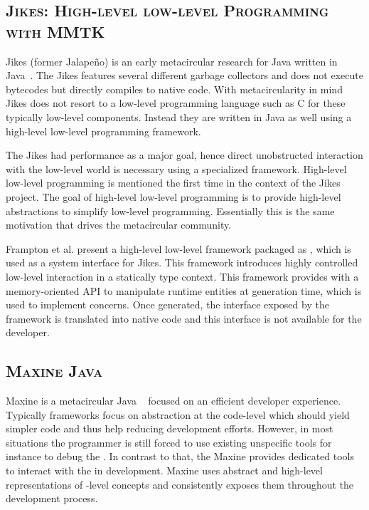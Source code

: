 \subsection*{\textsc{Jikes: High-level low-level Programming with MMTK}}
Jikes (former Jalapeño) is an early metacircular research \VM for Java written in Java~\cite{Alpe00a}.
The Jikes \VM features several different garbage collectors and does not execute bytecodes but directly compiles to native code.
With metacircularity in mind Jikes does not resort to a low-level programming language such as C for these typically low-level \VM components.
Instead they are written in Java as well using a high-level low-level programming framework.

The Jikes \VM had performance as a major goal, hence direct unobstructed interaction with the low-level world is necessary using a specialized framework.
High-level low-level programming \cite{Fram09a} is mentioned the first time in the context of the Jikes \VM project.
The goal of high-level low-level programming is to provide high-level abstractions to simplify low-level programming.
Essentially this is the same motivation that drives the metacircular \VM community.

Frampton et al. present a high-level low-level framework packaged as , which is used as a system interface for Jikes. This framework introduces highly controlled low-level interaction in a statically type context. This framework provides with a memory-oriented API to manipulate runtime entities at \VM generation time, which is used to implement \VM concerns. Once generated, the interface exposed by the  framework is translated into native code and this interface is not available for the developer.


\subsection*{\textsc{Maxine Java \VM}}
Maxine is a metacircular Java \VM~\cite{Wimm13a} focused on an efficient developer experience.
Typically \VM frameworks focus on abstraction at the code-level which should yield simpler code and thus help reducing development efforts.
However, in most situations the programmer is still forced to use existing unspecific tools for instance to debug the \VM.
In contrast to that, the Maxine \VM provides dedicated tools to interact with the \VM in development.
Maxine uses abstract and high-level representations of \VM-level concepts and consistently exposes them throughout the development process.

